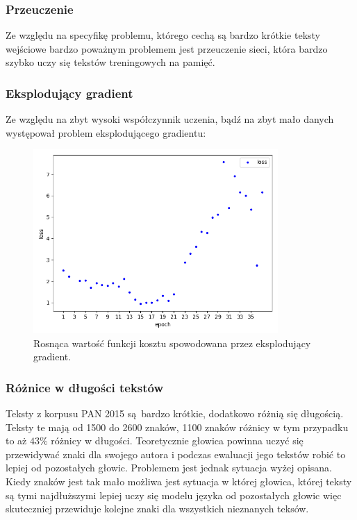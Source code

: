 \subsubsection{Przeuczenie}
Ze względu na specyfikę problemu, którego cechą są bardzo krótkie teksty wejściowe bardzo poważnym 
problemem jest przeuczenie sieci, która bardzo szybko uczy się tekstów treningowych na pamięć. 

\subsubsection{Eksplodujący gradient}
Ze względu na zbyt wysoki współczynnik uczenia, bądź na zbyt mało danych występował problem eksplodującego
gradientu:
\begin{figure}[H]
	\centering
	\includegraphics[height=7cm]{./images/exploading_gradient.png}
	\caption{Rosnąca wartość funkcji kosztu spowodowana przez eksplodujący gradient.}
	\label{fig:test5}
\end{figure}

\subsubsection{Różnice w długości tekstów}
Teksty z korpusu PAN 2015 \cite{pan} są bardzo krótkie, dodatkowo różnią się długością. Teksty te mają od 1500 do 2600 znaków, 1100 znaków 
różnicy w tym przypadku to aż $43\%$ różnicy w długości. Teoretycznie głowica powinna uczyć się przewidywać znaki dla 
swojego autora i podczas ewaluacji jego tekstów robić to lepiej od pozostałych głowic. Problemem jest
 jednak sytuacja wyżej opisana. Kiedy znaków jest tak mało 
możliwa jest sytuacja w której głowica, której teksty są tymi najdłuższymi lepiej uczy się modelu języka od
pozostałych głowic więc skuteczniej przewiduje kolejne znaki dla wszystkich nieznanych teksów.

